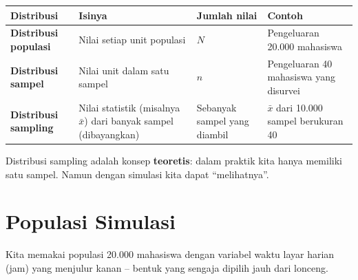 \documentclass[
  indonesian,
  letterpaper,
]{book}
\newcounter{none} %
\begin{document}
{\def\LTcaptype{none} %
\begin{longtable}[]{@{}
  >{\raggedright\arraybackslash}p{}
  >{\raggedright\arraybackslash}p{}
  >{\centering\arraybackslash}p{}
  >{\raggedright\arraybackslash}p{}@{}}
\toprule\noalign{}
\begin{minipage}[b]{\linewidth}\raggedright
Distribusi
\end{minipage} & \begin{minipage}[b]{\linewidth}\raggedright
Isinya
\end{minipage} & \begin{minipage}[b]{\linewidth}\centering
Jumlah nilai
\end{minipage} & \begin{minipage}[b]{\linewidth}\raggedright
Contoh
\end{minipage} \\
\midrule\noalign{}
\endhead
\bottomrule\noalign{}
\endlastfoot
\textbf{Distribusi populasi} & Nilai setiap unit populasi & \(N\) &
Pengeluaran 20.000 mahasiswa \\
\textbf{Distribusi sampel} & Nilai unit dalam satu sampel & \(n\) &
Pengeluaran 40 mahasiswa yang disurvei \\
\textbf{Distribusi sampling} & Nilai statistik (misalnya \(\bar{x}\))
dari banyak sampel (dibayangkan) & Sebanyak sampel yang diambil &
\(\bar{x}\) dari 10.000 sampel berukuran 40 \\
\end{longtable}
}

Distribusi sampling adalah konsep \textbf{teoretis}: dalam praktik kita
hanya memiliki satu sampel. Namun dengan simulasi kita dapat
``melihatnya''.

\section{Populasi Simulasi}\label{populasi-simulasi}

Kita memakai populasi 20.000 mahasiswa dengan variabel waktu layar
harian (jam) yang menjulur kanan -- bentuk yang sengaja dipilih jauh
dari lonceng.
\end{document}
